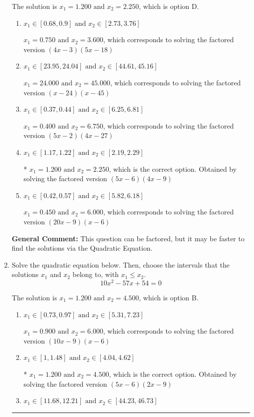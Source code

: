 \documentclass{extbook}[14pt]
\newcommand{\litem}[1]{\item #1

\rule{\textwidth}{0.4pt}}
\begin{document}
\begin{enumerate}
{The solution is \( x_1 = 1.200 \text{ and } x_2 = 2.250 \), which is option D.\begin{enumerate}[label=\Alph*.]
\item \( x_1 \in [0.68, 0.9] \text{ and } x_2 \in [2.73, 3.76] \)

$x_1 = 0.750 \text{ and } x_2 = 3.600$, which corresponds to solving the factored version $(4x -3)(5x -18)$
\item \( x_1 \in [23.95, 24.04] \text{ and } x_2 \in [44.61, 45.16] \)

$x_1 = 24.000 \text{ and } x_2 = 45.000$, which corresponds to solving the factored version $(x -24)(x -45)$
\item \( x_1 \in [0.37, 0.44] \text{ and } x_2 \in [6.25, 6.81] \)

$x_1 = 0.400 \text{ and } x_2 = 6.750$, which corresponds to solving the factored version $(5x -2)(4x -27)$
\item \( x_1 \in [1.17, 1.22] \text{ and } x_2 \in [2.19, 2.29] \)

* $x_1 = 1.200 \text{ and } x_2 = 2.250$, which is the correct option. Obtained by solving the factored version $(5x -6)(4x -9)$
\item \( x_1 \in [0.42, 0.57] \text{ and } x_2 \in [5.82, 6.18] \)

$x_1 = 0.450 \text{ and } x_2 = 6.000$, which corresponds to solving the factored version $(20x -9)(x -6)$
\end{enumerate}

\textbf{General Comment:} This question can be factored, but it may be faster to find the solutions via the Quadratic Equation.
}
\litem{
Solve the quadratic equation below. Then, choose the intervals that the solutions $x_1$ and $x_2$ belong to, with $x_1 \leq x_2$.
\[ 10x^{2} -57 x + 54 = 0 \]

The solution is \( x_1 = 1.200 \text{ and } x_2 = 4.500 \), which is option B.\begin{enumerate}[label=\Alph*.]
\item \( x_1 \in [0.73, 0.97] \text{ and } x_2 \in [5.31, 7.23] \)

$x_1 = 0.900 \text{ and } x_2 = 6.000$, which corresponds to solving the factored version $(10x -9)(x -6)$
\item \( x_1 \in [1, 1.48] \text{ and } x_2 \in [4.04, 4.62] \)

* $x_1 = 1.200 \text{ and } x_2 = 4.500$, which is the correct option. Obtained by solving the factored version $(5x -6)(2x -9)$
\item \( x_1 \in [11.68, 12.21] \text{ and } x_2 \in [44.23, 46.73] \)


\end{enumerate}}
\end{enumerate}
\end{document}
